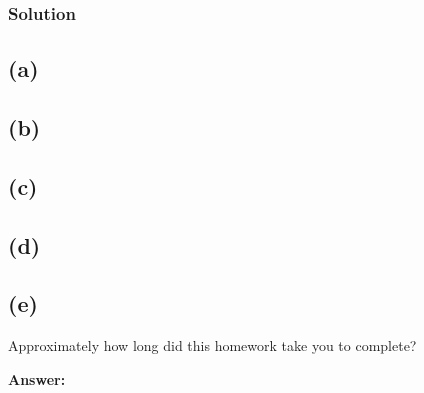 \documentclass[submit]{harvardml}
\begin{document}
\subsubsection*{Solution}
\subsection*{(a)}

\subsection*{(b)}

\subsection*{(c)}

\subsection*{(d)}


\subsection*{(e)}

\newpage
\begin{problem}[Calibration, 1pt]
Approximately how long did this homework take you to complete?
\end{problem}
\textbf{Answer:}
\end{document}

